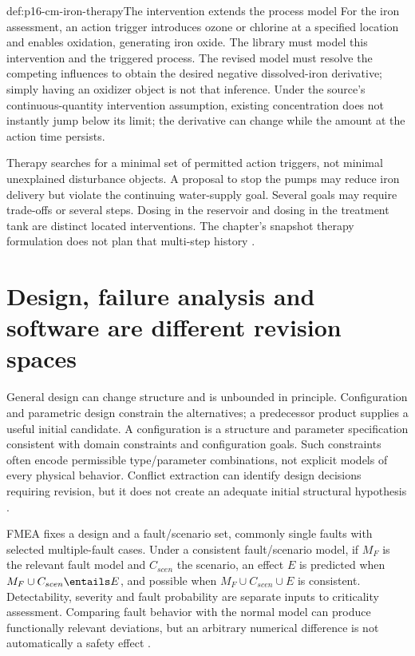 \begin{hbexample}{def:p16-cm-iron-therapy}{The intervention extends the process model}
For the iron assessment, an action trigger introduces ozone or chlorine
at a specified location and enables oxidation, generating iron oxide.
The library must model this intervention and the triggered process.
The revised model must resolve the competing influences to obtain the desired
negative dissolved-iron derivative; simply having an oxidizer object is
not that inference. Under the source's continuous-quantity intervention
assumption, existing concentration does not instantly jump below its limit;
the derivative can change while the amount at the action time persists.

Therapy searches for a minimal set of permitted action triggers, not minimal
unexplained disturbance objects. A proposal to stop the pumps may reduce
iron delivery but violate the continuing water-supply goal. Several goals
may require trade-offs or several steps. Dosing in the reservoir and dosing
in the treatment tank are distinct located interventions. The chapter's
snapshot therapy formulation does not plan that multi-step history
\cite[pp.~453--454]{Struss2008ModelBasedProblemSolving}.
\end{hbexample}

\section{Design, failure analysis and software are different revision spaces}
\label{sec:p16-cm-design}

General design can change structure and is unbounded in principle.
Configuration and parametric design constrain the alternatives; a predecessor
product supplies a useful initial candidate. A configuration is a structure
and parameter specification consistent with domain constraints and configuration
goals. Such constraints often encode permissible type/parameter combinations,
not explicit models of every physical behavior. Conflict extraction can
identify design decisions requiring revision, but it does not create an
adequate initial structural hypothesis
\cite[secs.~10.2.3,10.7.1]{Struss2008ModelBasedProblemSolving}.

FMEA fixes a design and a fault/scenario set, commonly single faults with
selected multiple-fault cases. Under a consistent fault/scenario model,
if \(M_F\) is the relevant fault model and
\(C_{scen}\) the scenario, an effect \(E\) is predicted when
\(M_F\cup C_{scen}\entails E\), and possible when
\(M_F\cup C_{scen}\cup E\) is consistent. Detectability, severity and
fault probability are separate inputs to criticality assessment. Comparing
fault behavior with the normal model can produce functionally relevant
deviations, but an arbitrary numerical difference is not automatically a
safety effect \cite[sec.~10.7.2]{Struss2008ModelBasedProblemSolving}.

